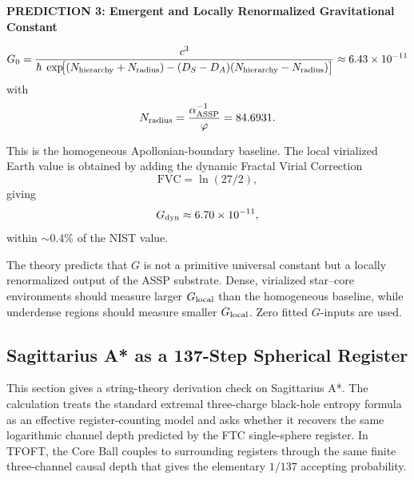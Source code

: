 \documentclass[11pt,a4paper]{article}
\begin{document}
      \begin{samepage}
      \begin{mdframed}[
        linewidth=0.8pt,
        linecolor=black,
        topline=true,
        bottomline=true,
        leftline=true,
        rightline=true,
        innerleftmargin=10pt,
        innerrightmargin=10pt,
        innertopmargin=8pt,
        innerbottommargin=8pt,
        skipabove=10pt,
        skipbelow=10pt
      ]
      \begin{minipage}{0.96\linewidth}
      \begin{center}
      \textbf{PREDICTION 3: Emergent and Locally Renormalized Gravitational Constant}
      \end{center}

      \[
      G_0
      =
      \frac{c^3}{\hbar\;\exp\!\bigl[
        (N_{\rm hierarchy}+N_{\rm radius})
        -(D_S-D_A)(N_{\rm hierarchy}-N_{\rm radius})
      \bigr]}
      \approx
      6.43\times10^{-11}
      \]
      with
      \[
      N_{\rm radius}
      =
      \frac{\alpha^{-1}_{\rm ASSP}}{\varphi}
      =
      84.6931.
      \]

      This is the homogeneous Apollonian-boundary baseline. The local virialized Earth value is obtained by adding the dynamic Fractal Virial Correction
      \[
      \mathrm{FVC}
      =
      \ln(27/2),
      \]
      giving
      \[
      G_{\rm dyn}
      \approx
      6.70\times10^{-11},
      \]
      within \(\sim0.4\%\) of the NIST value.

      The theory predicts that \(G\) is not a primitive universal constant but a locally renormalized output of the ASSP substrate. Dense, virialized star--core environments should measure larger \(G_{\rm local}\) than the homogeneous baseline, while underdense regions should measure smaller \(G_{\rm local}\). Zero fitted \(G\)-inputs are used.
      \end{minipage}
      \end{mdframed}
      \end{samepage}

  \subsection{Sagittarius A* as a 137-Step Spherical Register}
  \label{sec:sagA_register}

    This section gives a string-theory derivation check on Sagittarius A*. The calculation treats the standard extremal three-charge black-hole entropy formula as an effective register-counting model and asks whether it recovers the same logarithmic channel depth predicted by the FTC single-sphere register. In TFOFT, the Core Ball couples to surrounding registers through the same finite three-channel causal depth that gives the elementary \(1/137\) accepting probability. 
\end{document}
